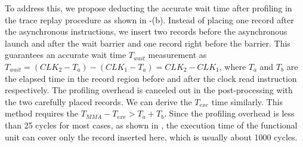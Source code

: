\begin{table}[]
  \caption{Profiled regions of the FA3 kernel}
  \label{tbl:fa3}
  \centering 
  \vspace{-0.5cm}
  \end{table}

To address this, we propose deducting the accurate wait time after profiling in the trace replay procedure as shown in \Fig{\ref{fig:trace_replay}}-(b).
Instead of placing one  record after the asynchronous instructions, we insert two  records before the asynchronous launch and after the wait barrier and one  record right before the barrier.
This guarantees an accurate wait time $T_{wait}$ measurement as $T_{wait} = (CLK_2-T_a) - (CLK_1-T_a)=CLK_2-CLK_1$, where $T_a$ and $T_b$ are the elapsed time in the record region before and after the clock read instruction respectively.
The profiling overhead is canceled out in the post-processing with the two carefully placed records.
We can derive the $T_{exe}$ time similarly.
This method requires the $T_{MMA}-T_{exe}>T_a+T_b$.
Since the profiling overhead is less than 25 cycles for most cases, as shown in \Sec{\ref{sec:evaluation:cycle}}, the execution time of the functional unit can cover only the record inserted here, which is usually about 1000 cycles.
